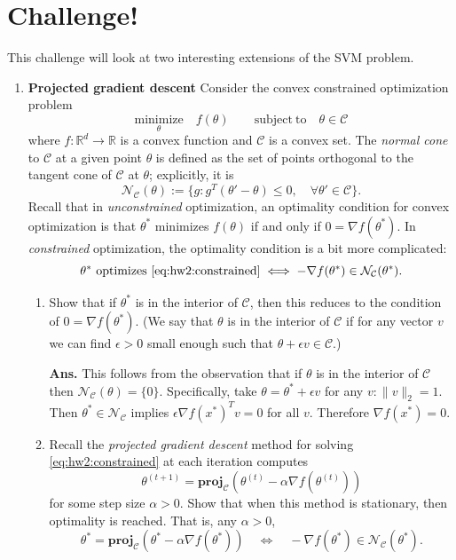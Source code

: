 \documentclass{article}
\newcommand{\minimize}[1]{\underset{#1}{\text{minimize}}}
\newcommand{\R}{\mathbb R}
\newcommand{\mN}{\mathcal N}
\newcommand{\mC}{\mathcal C}
\newcommand{\proj}{\mathbf{proj}}
\newcommand{\subjto}{\mathrm{subject~to}}
\newcommand{\showsolution}[1]{\textbf{Ans.} \;#1}
\begin{document}
\newpage

\section*{Challenge!}

This challenge will  look at two interesting extensions of the SVM problem.
\begin{enumerate}



\item \textbf{Projected gradient descent} 
Consider the convex constrained optimization problem 
\begin{equation}
\minimize{\theta} \quad f(\theta) \qquad \subjto \quad \theta \in \mC
\label{eq:hw2:constrained}
\end{equation}
where $f:\R^d\to\R$ is a convex function and $\mC$ is a convex set. The \emph{normal cone} to $\mC$ at a given point $\theta$ is defined as  the set of points orthogonal to the tangent cone of $\mC$ at $\theta$; explicitly, it is 
\[
\mN_\mC(\theta) := \{g : g^T(\theta' - \theta) \leq 0, \quad \forall \theta' \in \mC\}.
\]
Recall that in \emph{unconstrained} optimization, an optimality condition for convex optimization is that $\theta^*$ minimizes $f(\theta)$ if and only if $0 = \nabla f(\theta^*)$. In \emph{constrained} optimization, the optimality condition is a bit more complicated:
\[
\theta^* \text{ optimizes } \eqref{eq:hw2:constrained} \iff -\nabla f(\theta^*) \in \mN_\mC(\theta^*).
\]
\begin{enumerate}
\item Show that  if $\theta^*$ is in the interior of $\mC$, then this reduces to the condition of $0 = \nabla f(\theta^*)$. 
(We say that $\theta$ is in the interior of $\mC$ if  for any vector $v$ we can find $\epsilon > 0$ small enough such that $\theta + \epsilon v\in \mC$.)

\showsolution{
This follows from the observation that if $\theta$ is in the interior of $\mC$ then $\mN_\mC(\theta) = \{0\}$. Specifically, take $\theta = \theta^* + \epsilon v$ for any $v:\|v\|_2=1$. Then $\theta^*\in \mN_\mC$ implies $\epsilon \nabla f(x^*)^Tv = 0$ for all $v$. Therefore $\nabla f(x^*) = 0$.

}

\item Recall the \emph{projected gradient descent} method for solving \eqref{eq:hw2:constrained} at each iteration computes 
\[
\theta^{(t+1)} = \proj_{\mC}(\theta^{(t)} - \alpha \nabla f(\theta^{(t)}))
\]
for some step size $\alpha > 0$. Show that when this method is stationary, then optimality is reached. That is, any $\alpha > 0$,
\[
\theta^* = \proj_\mC(\theta^* - \alpha \nabla f(\theta^* ))\quad \iff \quad -\nabla f(\theta^*) \in \mN_\mC(\theta^*).
\]


\end{enumerate}
\end{enumerate}
\end{document}
